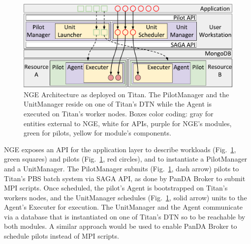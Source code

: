 \begin{figure}
  \centering
   \includegraphics[width=\columnwidth]{figures/architecture_compact_rp_paper.pdf}
  \caption{NGE Architecture as deployed on Titan. The PilotManager and the
  UnitManager reside on one of Titan's DTN while the Agent is executed on
  Titan's worker nodes. Boxes color coding: gray for entities external to NGE,
  white for APIs, purple for NGE's modules, green for pilots, yellow for
  module's components.}
\label{fig:arch-overview}
\end{figure}



NGE exposes an API for the application layer to describe workloads
(Fig.~\ref{fig:arch-overview}, green squares) and pilots
(Fig.~\ref{fig:arch-overview}, red circles), and to instantiate a PilotManager
and a UnitManager. The PilotManager submits (Fig.~\ref{fig:arch-overview}, dash
arrow) pilots to Titan's PBS batch system via SAGA API, as done by PanDA Broker
to submit MPI scripts. Once scheduled, the pilot's Agent is bootstrapped on
Titan's workers nodes, and  the UnitManager schedules
(Fig.~\ref{fig:arch-overview}, solid arrow) units to the Agent's Executer for
execution. The UnitManager and the Agent communicate via a database that is
instantiated on one of Titan's DTN so to be reachable by both modules. A similar
approach would be used to enable PanDA Broker to schedule pilots instead of MPI
scripts.

